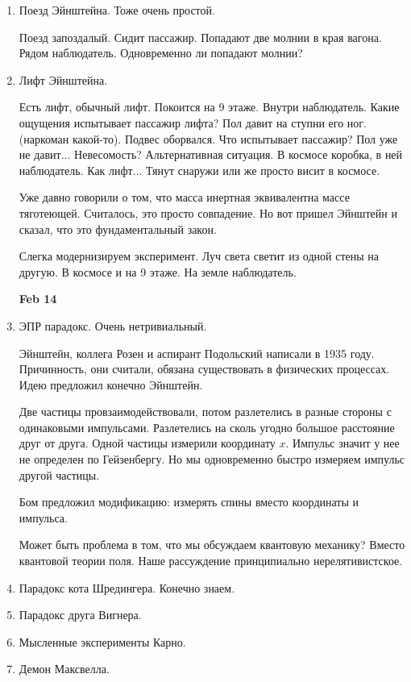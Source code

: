 \documentclass[a4paper, 12pt]{article}
\begin{document}
\begin{enumerate}
  \item Поезд Эйнштейна.
    Тоже очень простой.

    Поезд запоздалый. Сидит пассажир. Попадают две молнии в края вагона. 
    Рядом наблюдатель. Одновременно ли попадают молнии?

  \item Лифт Эйнштейна.

    Есть лифт, обычный лифт. Покоится на 9 этаже. Внутри наблюдатель. 
    Какие ощущения испытывает пассажир лифта? Пол давит на ступни его 
    ног. (наркоман какой-то). Подвес оборвался. Что испытывает пассажир? 
    Пол уже не давит... Невесомость? Альтернативная ситуация. В космосе 
    коробка, в ней наблюдатель. Как лифт... Тянут снаружи или же просто 
    висит в космосе.

    Уже давно говорили о том, что масса инертная эквивалентна массе 
    тяготеющей. Считалось, это просто совпадение. Но вот пришел Эйнштейн 
    и сказал, что это фундаментальный закон.

    Слегка модернизируем эксперимент. Луч света светит из одной стены на 
    другую. В космосе и на 9 этаже. На земле наблюдатель.

    \hfill \textbf{Feb 14}

  \item ЭПР парадокс.
    Очень нетривиальный.

    Эйнштейн, коллега Розен и аспирант Подольский написали в 1935 году. 
    Причинность, они считали, обязана существовать в физических 
    процессах. Идею предложил конечно Эйнштейн.

    Две частицы провзаимодействовали, потом разлетелись в разные стороны 
    с одинаковыми импульсами. Разлетелись на сколь угодно большое 
    расстояние друг от друга. Одной частицы измерили координату $x$. 
    Импульс значит у нее не определен по Гейзенбергу. Но мы одновременно 
    быстро измеряем импульс другой частицы.

    Бом предложил модификацию: измерять спины вместо координаты 
    и импульса.

    Может быть проблема в том, что мы обсуждаем квантовую механику? 
    Вместо квантовой теории поля. Наше рассуждение принципиально 
    нерелятивистское.

  \item Парадокс кота Шредингера.
    Конечно знаем.

  \item Парадокс друга Вигнера.
  \item Мысленные эксперименты Карно.
  \item Демон Максвелла.
\end{enumerate}
\end{document}

